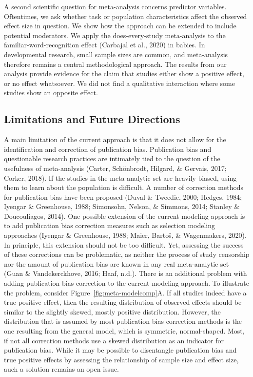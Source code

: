 \documentclass[english,,man]{apa6}
\begin{document}
A second scientific question for meta-analysis concerns predictor variables. Oftentimes, we ask whether task or population characteristics affect the observed effect size in question. We show how the approach can be extended to include potential moderators. We apply the does-every-study meta-analysis to the familiar-word-recognition effect (Carbajal et al., 2020) in babies. In developmental research, small sample sizes are common, and meta-analysis therefore remains a central methodological approach. The results from our analysis provide evidence for the claim that studies either show a positive effect, or no effect whatsoever. We did not find a qualitative interaction where some studies show an opposite effect.

\hypertarget{limitations-and-future-directions}{%
\subsection{Limitations and Future Directions}\label{limitations-and-future-directions}}

A main limitation of the current approach is that it does not allow for the identification and correction of publication bias. Publication bias and questionable research practices are intimately tied to the question of the usefulness of meta-analysis (Carter, Schönbrodt, Hilgard, \& Gervais, 2017; Corker, 2018). If the studies in the meta-analytic set are heavily biased, using them to learn about the population is difficult. A number of correction methods for publication bias have been proposed (Duval \& Tweedie, 2000; Hedges, 1984; Iyengar \& Greenhouse, 1988; Simonsohn, Nelson, \& Simmons, 2014; Stanley \& Doucouliagos, 2014). One possible extension of the current modeling approach is to add publication bias correction measures such as selection modeling approaches (Iyengar \& Greenhouse, 1988; Maier, Bartoš, \& Wagenmakers, 2020). In principle, this extension should not be too difficult. Yet, assessing the success of these corrections can be problematic, as neither the process of study censorship nor the amount of publication bias are known in any real meta-analytic set (Guan \& Vandekerckhove, 2016; Haaf, n.d.). There is an additional problem with adding publication bias correction to the current modeling approach. To illustrate the problem, consider Figure~\ref{fig:meta-modelcomp}A. If all studies indeed have a true positive effect, then the resulting distribution of observed effects should be similar to the slightly skewed, mostly positive distribution. However, the distribution that is assumed by most publication bias correction methods is the one resulting from the general model, which is symmetric, normal-shaped. Most, if not all correction methods use a skewed distribution as an indicator for publication bias. While it may be possible to disentangle publication bias and true positive effects by assessing the relationship of sample size and effect size, auch a solution remains an open issue.
\end{document}
